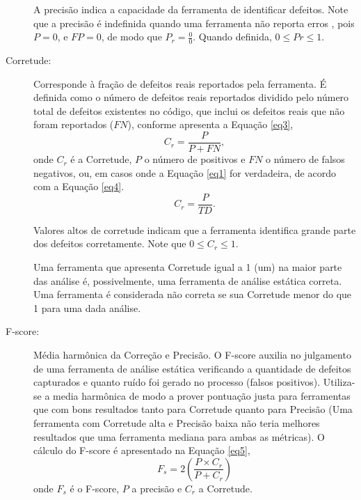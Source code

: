 \begin{description}
  A precisão indica a capacidade da ferramenta de identificar defeitos. Note que a precisão é indefinida quando uma ferramenta não reporta erros \cite{nsa}, pois $P = 0$, e $FP = 0$, de modo que $P_r = \frac{0}{0}$. Quando definida, $0 \leq Pr \leq 1$.

\item[Corretude:] Corresponde à fração de defeitos reais reportados pela ferramenta. É definida como o número de defeitos reais reportados dividido pelo número total de defeitos existentes no código, que inclui os defeitos reais que não foram reportados ($FN$), conforme apresenta a Equação \eqref{eq3},
\begin{equation}\label{eq3}
  C_r = \frac{P}{P + FN},
\end{equation}
  onde $C_r$ é a Corretude, $P$ o número de positivos e $FN$ o número de falsos negativos, ou, em casos onde a Equação \eqref{eq1} for verdadeira, de acordo com a Equação \eqref{eq4}.
\begin{equation}\label{eq4}
  C_r = \frac{P}{TD}.
\end{equation}

  Valores altos de corretude indicam que a ferramenta identifica grande parte dos defeitos corretamente. Note que $0 \leq C_r \leq 1$.

  Uma ferramenta que apresenta Corretude igual a 1 (um) na maior parte das análise é, possivelmente, uma ferramenta de análise estática correta. Uma ferramenta é considerada não correta se sua Corretude  menor do que 1 para uma dada análise.

  \item[F-score:] Média harmônica da Correção e Precisão. O F-score auxilia no julgamento de uma ferramenta de análise estática verificando a quantidade de defeitos capturados e quanto ruído foi gerado no processo (falsos positivos). Utiliza-se a media harmônica de modo a prover pontuação justa para ferramentas que com bons resultados tanto para Corretude quanto para Precisão (Uma ferramenta com Corretude alta e Precisão baixa não teria melhores resultados que uma ferramenta mediana para ambas as métricas). O cálculo do F-score é apresentado na Equação \eqref{eq5},
\begin{equation}\label{eq5}
  F_s = 2\left(\frac{P \times C_r}{P + C_r}\right)
\end{equation}
onde $F_s$ é o F-score, $P$ a precisão e $C_r$ a Corretude.
\end{description}

